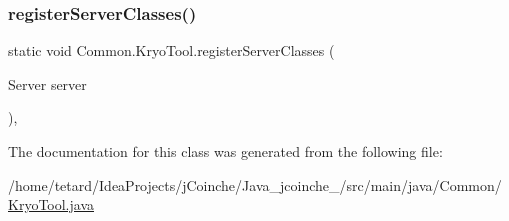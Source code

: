 \mbox{\label{classCommon_1_1KryoTool_a263006a45f41c011a3ad7dfb0086f551}} 
\subsubsection{\texorpdfstring{register\+Server\+Classes()}{registerServerClasses()}}
{\footnotesize\ttfamily static void Common.\+Kryo\+Tool.\+register\+Server\+Classes (\begin{DoxyParamCaption}\item[{Server}]{server }\end{DoxyParamCaption})\hspace{0.3cm}{\ttfamily [inline]}, {\ttfamily [static]}}



The documentation for this class was generated from the following file\+:\begin{DoxyCompactItemize}
\item 
/home/tetard/\+Idea\+Projects/j\+Coinche/\+Java\+\_\+jcoinche\+\_/src/main/java/\+Common/\mbox{\hyperlink{KryoTool_8java}{Kryo\+Tool.\+java}}\end{DoxyCompactItemize}

